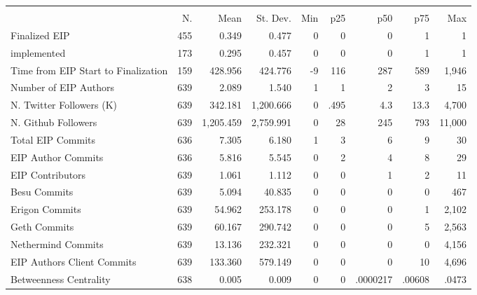{
\def\sym#1{\ifmmode^{#1}\else\(^{#1}\)\fi}
\begin{tabular}{l*{1}{rrrrrrrr}}
\hline\hline
                    &\multicolumn{8}{c}{}                                                                                   \\
                    &          N.&        Mean&    St. Dev.&         Min&         p25&         p50&         p75&         Max\\
\hline
Finalized EIP       &         455&       0.349&       0.477&           0&           0&           0&           1&           1\\
implemented         &         173&       0.295&       0.457&           0&           0&           0&           1&           1\\
Time from EIP Start to Finalization&         159&     428.956&     424.776&          -9&         116&         287&         589&       1,946\\
Number of EIP Authors&         639&       2.089&       1.540&           1&           1&           2&           3&          15\\
N. Twitter Followers (K)&         639&     342.181&   1,200.666&           0&        .495&         4.3&        13.3&       4,700\\
N. Github Followers &         639&   1,205.459&   2,759.991&           0&          28&         245&         793&      11,000\\
Total EIP Commits   &         636&       7.305&       6.180&           1&           3&           6&           9&          30\\
EIP Author Commits  &         636&       5.816&       5.545&           0&           2&           4&           8&          29\\
EIP Contributors    &         639&       1.061&       1.112&           0&           0&           1&           2&          11\\
Besu Commits        &         639&       5.094&      40.835&           0&           0&           0&           0&         467\\
Erigon Commits      &         639&      54.962&     253.178&           0&           0&           0&           1&       2,102\\
Geth Commits        &         639&      60.167&     290.742&           0&           0&           0&           5&       2,563\\
Nethermind Commits  &         639&      13.136&     232.321&           0&           0&           0&           0&       4,156\\
EIP Authors Client Commits&         639&     133.360&     579.149&           0&           0&           0&          10&       4,696\\
Betweenness Centrality&         638&       0.005&       0.009&           0&           0&    .0000217&      .00608&       .0473\\
\hline\hline
\end{tabular}
}
